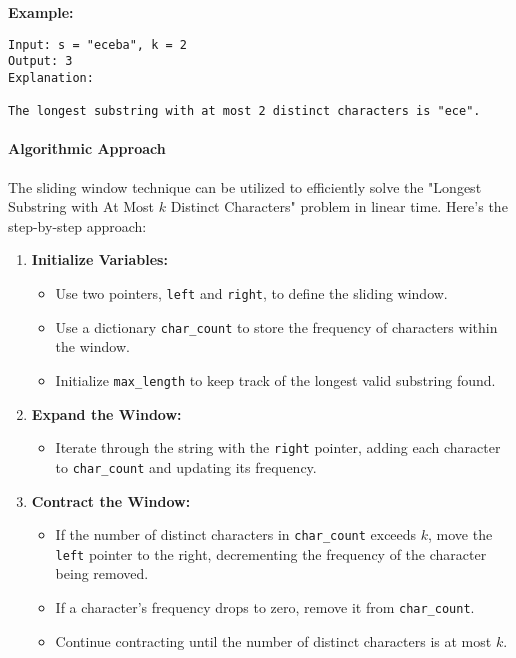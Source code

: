 \textbf{Example:}
\begin{verbatim}
Input: s = "eceba", k = 2
Output: 3
Explanation: 

The longest substring with at most 2 distinct characters is "ece".
\end{verbatim}

\paragraph*{Algorithmic Approach}

The sliding window technique can be utilized to efficiently solve the "Longest Substring with At Most \(k\) Distinct Characters" problem in linear time. Here's the step-by-step approach:

\begin{enumerate}
    \item \textbf{Initialize Variables:}
    \begin{itemize}
        \item Use two pointers, \texttt{left} and \texttt{right}, to define the sliding window.
        \item Use a dictionary \texttt{char\_count} to store the frequency of characters within the window.
        \item Initialize \texttt{max\_length} to keep track of the longest valid substring found.
    \end{itemize}
    
    \item \textbf{Expand the Window:}
    \begin{itemize}
        \item Iterate through the string with the \texttt{right} pointer, adding each character to \texttt{char\_count} and updating its frequency.
    \end{itemize}
    
    \item \textbf{Contract the Window:}
    \begin{itemize}
        \item If the number of distinct characters in \texttt{char\_count} exceeds \(k\), move the \texttt{left} pointer to the right, decrementing the frequency of the character being removed.
        \item If a character's frequency drops to zero, remove it from \texttt{char\_count}.
        \item Continue contracting until the number of distinct characters is at most \(k\).
    \end{itemize}
    

\end{enumerate}
